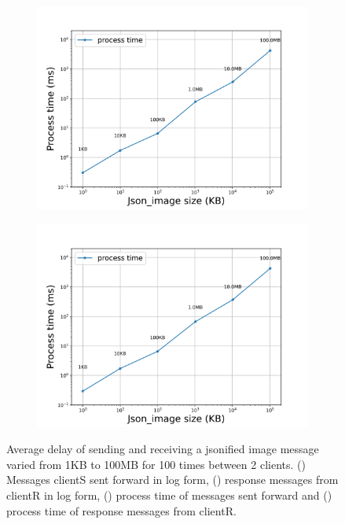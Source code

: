 \begin{figure}[htb]
\begin{subfigure}{0.49\textwidth}
    \end{subfigure}
    \begin{subfigure}{0.49\textwidth}
        \centering
        \includegraphics[width=\textwidth]{figures/tests/proportional_tests/Average_json_image_messages_sending_time_of_100_tests_1KB_to_100MB.png}\hfill 
        \caption{} \label{fig: proportional-imagesize-a}
    \end{subfigure}
    \begin{subfigure}{0.49\textwidth}
        \centering
        \includegraphics[width=\textwidth]{figures/tests/proportional_tests/Average_json_image_messages_receiving_time_of_100_tests_1KB_to_100MB.png}\hfill 
        \caption{} \label{fig: proportional-imagesize-b}
    \end{subfigure}

    \caption{Average delay of sending and receiving a jsonified image message varied from 1KB 
    to 100MB for 100 times between 2 clients. () 
    Messages clientS sent forward in log form, 
    () response messages from clientR in log form, 
    () process time of messages sent forward  
    and () process time of response messages from clientR. 
    \label{fig: proportional-imagesize}}
\end{figure}

